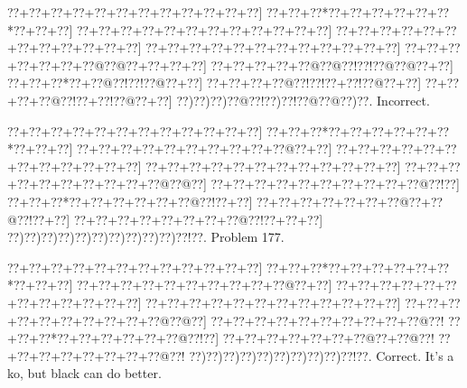 \documentclass[a5paper]{article}
\begin{document}
\begin{center}
{\goo
\0??+\0??+\0??+\0??+\0??+\0??+\0??+\0??+\0??+\0??+\0??+\0??]
\0??+\0??+\0??*\0??+\0??+\0??+\0??+\0??+\0??*\0??+\0??+\0??]
\0??+\0??+\0??+\0??+\0??+\0??+\0??+\0??+\0??+\0??+\0??+\0??]
\0??+\0??+\0??+\0??+\0??+\0??+\0??+\0??+\0??+\0??+\0??+\0??]
\0??+\0??+\0??+\0??+\0??+\0??+\0??+\0??+\0??+\0??+\0??+\0??]
\0??+\0??+\0??+\0??+\0??+\0??+\0??@\0??@\0??+\0??+\0??+\0??]
\0??+\0??+\0??+\0??+\0??@\0??@\0??!\0??!\0??@\0??@\0??+\0??]
\0??+\0??+\0??*\0??+\0??@\0??!\0??!\0??@\0??+\0??]
\0??+\0??+\0??+\0??@\0??!\0??!\0??+\0??!\0??@\0??+\0??]
\0??+\0??+\0??+\0??@\0??!\0??+\0??!\0??@\0??+\0??]
\0??)\0??)\0??)\0??@\0??!\0??)\0??!\0??@\0??@\0??)\0??.
}
Incorrect. 

\end{center}
\newpage
\begin{center}
{\goo
\0??+\0??+\0??+\0??+\0??+\0??+\0??+\0??+\0??+\0??+\0??+\0??]
\0??+\0??+\0??*\0??+\0??+\0??+\0??+\0??+\0??*\0??+\0??+\0??]
\0??+\0??+\0??+\0??+\0??+\0??+\0??+\0??+\0??+\0??@\0??+\0??]
\0??+\0??+\0??+\0??+\0??+\0??+\0??+\0??+\0??+\0??+\0??+\0??]
\0??+\0??+\0??+\0??+\0??+\0??+\0??+\0??+\0??+\0??+\0??+\0??]
\0??+\0??+\0??+\0??+\0??+\0??+\0??+\0??+\0??+\0??@\0??@\0??]
\0??+\0??+\0??+\0??+\0??+\0??+\0??+\0??+\0??+\0??@\0??!\0??]
\0??+\0??+\0??*\0??+\0??+\0??+\0??+\0??+\0??@\0??!\0??+\0??]
\0??+\0??+\0??+\0??+\0??+\0??+\0??@\0??+\0??@\0??!\0??+\0??]
\0??+\0??+\0??+\0??+\0??+\0??+\0??+\0??@\0??!\0??+\0??+\0??]
\0??)\0??)\0??)\0??)\0??)\0??)\0??)\0??)\0??)\0??)\0??!\0??.
}
Problem 177.

\end{center}
\begin{center}
{\goo
\0??+\0??+\0??+\0??+\0??+\0??+\0??+\0??+\0??+\0??+\0??+\0??]
\0??+\0??+\0??*\0??+\0??+\0??+\0??+\0??+\0??*\0??+\0??+\0??]
\0??+\0??+\0??+\0??+\0??+\0??+\0??+\0??+\0??+\0??@\0??+\0??]
\0??+\0??+\0??+\0??+\0??+\0??+\0??+\0??+\0??+\0??+\0??+\0??]
\0??+\0??+\0??+\0??+\0??+\0??+\0??+\0??+\0??+\0??+\0??+\0??]
\0??+\0??+\0??+\0??+\0??+\0??+\0??+\0??+\0??+\0??@\0??@\0??]
\0??+\0??+\0??+\0??+\0??+\0??+\0??+\0??+\0??+\0??@\0??!
\0??+\0??+\0??*\0??+\0??+\0??+\0??+\0??+\0??@\0??!\0??]
\0??+\0??+\0??+\0??+\0??+\0??+\0??@\0??+\0??@\0??!
\0??+\0??+\0??+\0??+\0??+\0??+\0??+\0??@\0??!
\0??)\0??)\0??)\0??)\0??)\0??)\0??)\0??)\0??)\0??!\0??.
}
Correct. It's a ko, but black can do better.

\end{center}
\end{document}
